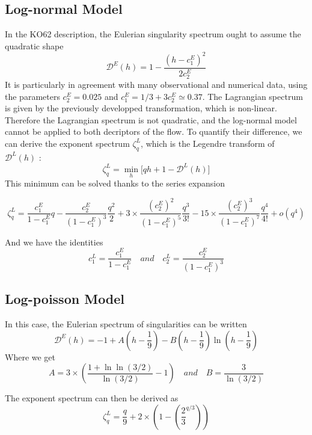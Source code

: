 \subsection{Log-normal Model}
In the KO62 description, the Eulerian singularity spectrum ought to assume the quadratic shape
\begin{equation}
    \mathcal{D}^E(h)=1-\frac{(h-c_1^E)^2}{2c_2^E}
\end{equation}
It is particularly in agreement with many observational and numerical data, using the parameters $c_2^E=0.025$ and $c_1^E=1/3+3c_2^E\simeq0.37$. 
The Lagrangian spectrum is given by the previously developped transformation, which is non-linear. 
Therefore the Lagrangian spectrum is not quadratic, and the log-normal model cannot be applied to both decriptors of the flow. To quantify their difference, we can derive the exponent spectrum $\zeta_q^L$, which is the Legendre transform of $\mathcal{D}^L(h)$ :
\begin{equation}
    \zeta_q^L=\min_h\big[qh+1-\mathcal{D}^L(h)\big]
\end{equation}
This minimum can be solved thanks to the series expansion 
\begin{fullwidth}\begin{equation}
    \zeta_q^L=\frac{c_1^E}{1-c_1^E}q-\frac{c_2^E}{(1-c_1^E)^3}\frac{q^2}{2}+3\times\frac{(c_2^E)^2}{(1-c_1^E)^5}\frac{q^3}{3!}-15\times\frac{(c_2^E)^3}{(1-c_1^E)^7}\frac{q^4}{4!}+o(q^4)
\end{equation}\end{fullwidth}
And we have the identities
\begin{equation}
    c_1^L=\frac{c_1^E}{1-c_1^E}\quad and\quad c_2^L=\frac{c_2^E}{(1-c_1^E)^3}
\end{equation}

\subsection{Log-poisson Model}
In this case, the Eulerian spectrum of singularities can be written
\begin{equation}
    \mathcal{D}^E(h)=-1+A\left(h-\frac{1}{9}\right)-B\left(h-\frac{1}{9}\right)\ln\left(h-\frac{1}{9}\right)
\end{equation}
Where we get
\begin{equation}
    A=3\times\left(\frac{1+\ln\ln(3/2)}{\ln(3/2)}-1\right)\quad and\quad B=\frac{3}{\ln(3/2)}
\end{equation}

The exponent spectrum can then be derived as
\begin{equation}
    \zeta_q^L=\frac{q}{9}+2\times\left(1-\left(\frac{2}{3}^{q/3}\right)\right)
\end{equation}

